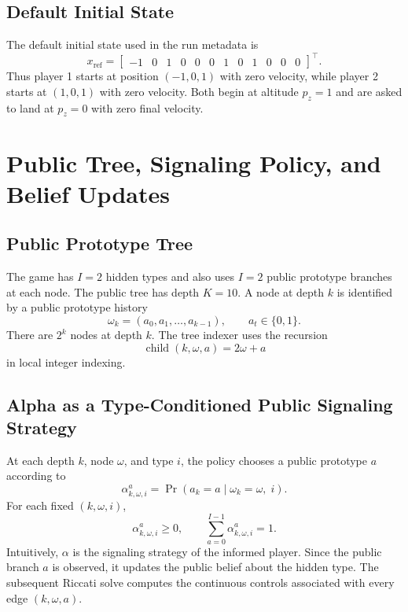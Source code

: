 \documentclass[11pt]{article}
\begin{document}
\subsection{Default Initial State}

The default initial state used in the run metadata is
\[
    x_{\mathrm{ref}} =
    \begin{bmatrix}
    -1 & 0 & 1 & 0 & 0 & 0 &
     1 & 0 & 1 & 0 & 0 & 0
    \end{bmatrix}^{\!\top}.
\]
Thus player 1 starts at position $(-1,0,1)$ with zero velocity, while player 2
starts at $(1,0,1)$ with zero velocity.  Both begin at altitude $p_z=1$ and are
asked to land at $p_z=0$ with zero final velocity.

\section{Public Tree, Signaling Policy, and Belief Updates}

\subsection{Public Prototype Tree}

The game has $I=2$ hidden types and also uses $I=2$ public prototype branches
at each node.  The public tree has depth $K=10$.  A node at depth $k$ is
identified by a public prototype history
\[
    \omega_k=(a_0,a_1,\ldots,a_{k-1}),
    \qquad
    a_t \in \{0,1\}.
\]
There are $2^k$ nodes at depth $k$.  The tree indexer uses the recursion
\[
    \operatorname{child}(k,\omega,a) = 2\omega + a
\]
in local integer indexing.

\subsection{Alpha as a Type-Conditioned Public Signaling Strategy}

At each depth $k$, node $\omega$, and type $i$, the policy chooses a public
prototype $a$ according to
\[
    \alpha_{k,\omega,i}^{a}
    =
    \Pr(a_k=a \mid \omega_k=\omega,\; i).
\]
For each fixed $(k,\omega,i)$,
\[
    \alpha_{k,\omega,i}^{a}\ge 0,
    \qquad
    \sum_{a=0}^{I-1}\alpha_{k,\omega,i}^{a}=1.
\]
Intuitively, $\alpha$ is the signaling strategy of the informed player.  Since
the public branch $a$ is observed, it updates the public belief about the
hidden type.  The subsequent Riccati solve computes the continuous controls
associated with every edge $(k,\omega,a)$.
\end{document}
